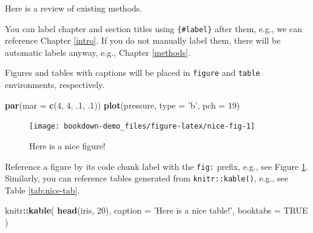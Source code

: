 \documentclass[]{book}
\newenvironment{Shaded}{\begin{snugshade}}{\end{snugshade}}
\newcommand{\DataTypeTok}[1]{\textcolor[rgb]{0.13,0.29,0.53}{#1}}
\newcommand{\DecValTok}[1]{\textcolor[rgb]{0.00,0.00,0.81}{#1}}
\newcommand{\FloatTok}[1]{\textcolor[rgb]{0.00,0.00,0.81}{#1}}
\newcommand{\KeywordTok}[1]{\textcolor[rgb]{0.13,0.29,0.53}{\textbf{#1}}}
\newcommand{\NormalTok}[1]{#1}
\newcommand{\OperatorTok}[1]{\textcolor[rgb]{0.81,0.36,0.00}{\textbf{#1}}}
\newcommand{\OtherTok}[1]{\textcolor[rgb]{0.56,0.35,0.01}{#1}}
\newcommand{\StringTok}[1]{\textcolor[rgb]{0.31,0.60,0.02}{#1}}
\begin{document}
Here is a review of existing methods.

You can label chapter and section titles using \texttt{\{\#label\}} after them, e.g., we can reference Chapter \ref{intro}. If you do not manually label them, there will be automatic labels anyway, e.g., Chapter \ref{methods}.

Figures and tables with captions will be placed in \texttt{figure} and \texttt{table} environments, respectively.

\begin{Shaded}
\begin{Highlighting}[]
\KeywordTok{par}\NormalTok{(}\DataTypeTok{mar =} \KeywordTok{c}\NormalTok{(}\DecValTok{4}\NormalTok{, }\DecValTok{4}\NormalTok{, }\FloatTok{.1}\NormalTok{, }\FloatTok{.1}\NormalTok{))}
\KeywordTok{plot}\NormalTok{(pressure, }\DataTypeTok{type =} \StringTok{'b'}\NormalTok{, }\DataTypeTok{pch =} \DecValTok{19}\NormalTok{)}
\end{Highlighting}
\end{Shaded}

\begin{figure}

{\centering \texttt{[image: bookdown-demo\_files/figure-latex/nice-fig-1]} 

}

\caption{Here is a nice figure!}\label{fig:nice-fig}
\end{figure}

Reference a figure by its code chunk label with the \texttt{fig:} prefix, e.g., see Figure \ref{fig:nice-fig}. Similarly, you can reference tables generated from \texttt{knitr::kable()}, e.g., see Table \ref{tab:nice-tab}.

\begin{Shaded}
\begin{Highlighting}[]
\NormalTok{knitr}\OperatorTok{::}\KeywordTok{kable}\NormalTok{(}
  \KeywordTok{head}\NormalTok{(iris, }\DecValTok{20}\NormalTok{), }\DataTypeTok{caption =} \StringTok{'Here is a nice table!'}\NormalTok{,}
  \DataTypeTok{booktabs =} \OtherTok{TRUE}
\NormalTok{)}
\end{Highlighting}
\end{Shaded}
\end{document}

